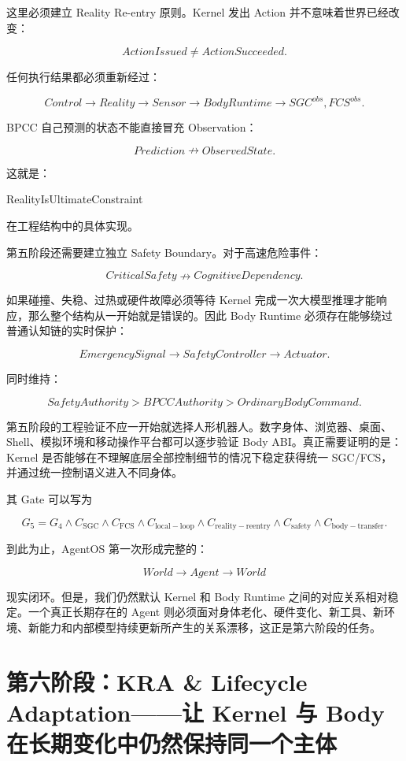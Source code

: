 这里必须建立 Reality Re-entry 原则。Kernel 发出 Action 并不意味着世界已经改变：

\[
ActionIssued
\neq
ActionSucceeded.
\]

任何执行结果都必须重新经过：

\[
Control
\rightarrow
Reality
\rightarrow
Sensor
\rightarrow
BodyRuntime
\rightarrow
SGC^{obs},FCS^{obs}.
\]

BPCC 自己预测的状态不能直接冒充 Observation：

\[
Prediction
\nrightarrow
ObservedState.
\]

这就是：

\begin{statementbox}
RealityIsUltimateConstraint
\end{statementbox}

在工程结构中的具体实现。

第五阶段还需要建立独立 Safety Boundary。对于高速危险事件：

\[
CriticalSafety
\nrightarrow
CognitiveDependency.
\]

如果碰撞、失稳、过热或硬件故障必须等待 Kernel 完成一次大模型推理才能响应，那么整个结构从一开始就是错误的。因此 Body Runtime 必须存在能够绕过普通认知链的实时保护：

\[
EmergencySignal
\rightarrow
SafetyController
\rightarrow
Actuator.
\]

同时维持：

\[
SafetyAuthority
>
BPCCAuthority
>
OrdinaryBodyCommand.
\]

第五阶段的工程验证不应一开始就选择人形机器人。数字身体、浏览器、桌面、Shell、模拟环境和移动操作平台都可以逐步验证 Body ABI。真正需要证明的是：Kernel 是否能够在不理解底层全部控制细节的情况下稳定获得统一 SGC/FCS，并通过统一控制语义进入不同身体。

其 Gate 可以写为

\[
G_5
=
G_4
\land
C_{\mathrm{SGC}}
\land
C_{\mathrm{FCS}}
\land
C_{\mathrm{local-loop}}
\land
C_{\mathrm{reality-reentry}}
\land
C_{\mathrm{safety}}
\land
C_{\mathrm{body-transfer}}.
\]

到此为止，AgentOS 第一次形成完整的：

\[
World
\rightarrow
Agent
\rightarrow
World
\]

现实闭环。但是，我们仍然默认 Kernel 和 Body Runtime 之间的对应关系相对稳定。一个真正长期存在的 Agent 则必须面对身体老化、硬件变化、新工具、新环境、新能力和内部模型持续更新所产生的关系漂移，这正是第六阶段的任务。

\section{第六阶段：KRA \& Lifecycle Adaptation——让 Kernel 与 Body 在长期变化中仍然保持同一个主体}

